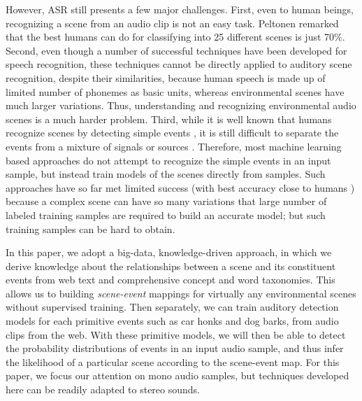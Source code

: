 However, ASR still presents a few major challenges. First, even to human beings,
recognizing a scene from an audio clip is not an easy task. Peltonen \et\cite{peltonen2001recognition} remarked that the best humans can do 
for classifying into 25 different scenes is just 70\%. 
Second, even though a number of successful techniques have been developed
for speech recognition, these techniques cannot be directly applied to
auditory scene recognition, despite their similarities, 
because human speech is made up of limited number of phonemes as basic units, 
whereas environmental scenes have much larger variations. 
Thus, understanding and recognizing environmental audio scenes
is a much harder problem.
Third, while it is well known that humans
recognize scenes by detecting simple events 
\cite{peltonen2001recognition,heittola2010audio}, 
it is still difficult to separate the events from a mixture of 
signals or sources 
\cite{comon2010handbook}. Therefore,
most machine learning based approaches do not attempt to recognize the simple
events in an input sample, but instead train models of the scenes directly
from samples. Such approaches have so far met limited success (with best accuracy close to humans \cite{1561288}) because a complex scene can have so many variations
that large number of labeled training samples are required to build 
an accurate model; but such training samples can be hard to obtain.

In this paper, we adopt a big-data, knowledge-driven approach, in which
we derive knowledge about the relationships between a scene and its
constituent events from web text and comprehensive concept and
word taxonomies. This allows us to building {\em scene-event} mappings 
for virtually any environmental scenes without supervised training.
Then separately, we can train auditory detection models for each
primitive events such as car honks and dog barks, from audio clips from
the web. With these primitive models, we will then be able to detect
the probability distributions of events in an input audio sample, and 
thus infer the likelihood of a particular scene according to the
scene-event map. For this paper, we focus our attention on mono audio samples,
but techniques developed here can be readily adapted to stereo sounds.

